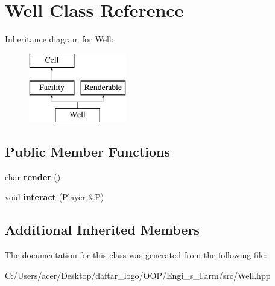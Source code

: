 \hypertarget{class_well}{}\section{Well Class Reference}
\label{class_well}
Inheritance diagram for Well\+:\begin{figure}[H]
\begin{center}
\leavevmode
\includegraphics[height=3.000000cm]{class_well}
\end{center}
\end{figure}
\subsection*{Public Member Functions}
\begin{DoxyCompactItemize}
\item 
\mbox{\label{class_well_a69b55113e60627af17e1965fb54356e7}} 
char {\bfseries render} ()
\item 
\mbox{\label{class_well_a224abe167edd6e91f1b017ae1aa192b2}} 
void {\bfseries interact} (\mbox{\hyperlink{class_player}{Player}} \&P)
\end{DoxyCompactItemize}
\subsection*{Additional Inherited Members}


The documentation for this class was generated from the following file\+:\begin{DoxyCompactItemize}
\item 
C\+:/\+Users/acer/\+Desktop/daftar\+\_\+logo/\+O\+O\+P/\+Engi\+\_\+s\+\_\+\+Farm/src/Well.\+hpp\end{DoxyCompactItemize}
